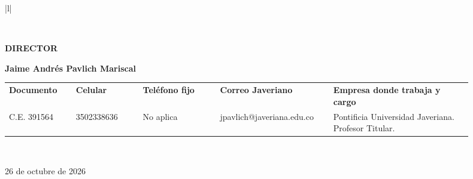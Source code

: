 \begin{tabular}{|l|}
\begin{minipage}{\dimexpr\linewidth-2\tabcolsep-2\arrayrulewidth\relax}
\end{minipage}\\\hline
\begin{minipage}{\dimexpr\linewidth-2\tabcolsep-2\arrayrulewidth\relax}\vspace{2mm}\raggedright
\textbf{DIRECTOR}\par\vspace{2mm}
\textbf{Jaime Andrés Pavlich Mariscal}\enspace\hrulefill\par\vspace{1mm}
{\fontsize{8}{9.5}\selectfont\begin{tabular}[t]{@{}p{0.13\linewidth}p{0.13\linewidth}p{0.15\linewidth}p{0.22\linewidth}p{0.27\linewidth}@{}}
\textbf{Documento} & \textbf{Celular} & \textbf{Teléfono fijo} & \textbf{Correo Javeriano} & \textbf{Empresa donde trabaja y cargo}\\
C.E. 391564 & 3502338636 & No aplica & jpavlich@javeriana.edu.co & Pontificia Universidad Javeriana. Profesor Titular.
\end{tabular}\par}\vspace{4mm}
\end{minipage}\\\hline
\end{tabular}\endgroup
\vfill\begin{flushright}\small 26 de octubre de 2026\end{flushright}
\restoregeometry
\setlength{\headwidth}{\textwidth}
\clearpage
 